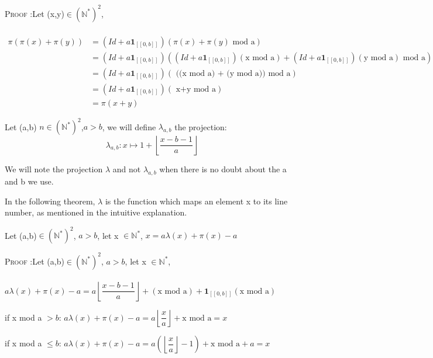 \textsc{Proof :}Let (x,y)\(\in (\mathbb{N}^*)^2\),

\begin{align*}
 \\\pi(\pi(x)+\pi(y)) & = (Id+a\mathbf{1}_{ [\![0,b]\!]})(\pi(x)+\pi(y)\text{ mod a})\\
& = (Id+a\mathbf{1}_{ [\![0,b]\!]})((Id+a\mathbf{1}_{ [\![0,b]\!]})(\text{x mod a})+(Id+a\mathbf{1}_{ [\![0,b]\!]})(\text{y mod a})\text{ mod a}) \\
& = (Id+a\mathbf{1}_{ [\![0,b]\!]})(\text{ ((x mod a) + (y mod a)) mod a})\\
& =(Id+a\mathbf{1}_{ [\![0,b]\!]})(\text{ x+y mod a})\\
& =\pi(x+y)
\end{align*}


\begin{definition}

Let (a,b) \(n \in (\mathbb{N}^*)^2\),\(a>b\), we will define \(\lambda_{a,b}\) the projection:
\[ \lambda_{a,b}:x \longmapsto 1+ \left\lfloor\dfrac{x-b-1}{a}\right\rfloor\]
\end{definition}

We will note  the projection \(\lambda\) and not \(\lambda_{a,b}\) when there is no doubt about the a and b we use.

\begin{remark}
In the following theorem, \(\lambda\) is the function which maps an element x to its line number, as mentioned in the intuitive explanation.
\end{remark}

\begin{proposition}
Let (a,b)\(\in (\mathbb{N}^*)^2\), \(a>b\), let x \(\in \mathbb{N}^*\), \(x=a\lambda(x)+\pi(x)-a\)
\end{proposition}
\textsc{Proof :}Let (a,b)\(\in (\mathbb{N}^*)^2\), \(a>b\), let x \(\in \mathbb{N}^*\),
\\\\ \(a\lambda(x)+\pi(x)-a=a\left\lfloor\dfrac{x-b-1}{a}\right\rfloor+(\text{x mod a})+\mathbf{1}_{ [\![0,b]\!]}(\text{x mod a})\)

if x mod a \(>b\): \(a\lambda(x)+\pi(x)-a=a\left\lfloor\dfrac{x}{a}\right\rfloor+\text{x mod a}=x\)

if x mod a \(\leqslant b\):
\(a\lambda(x)+\pi(x)-a=a(\left\lfloor\dfrac{x}{a}\right\rfloor-1)+\text{x mod a}+a=x\)


